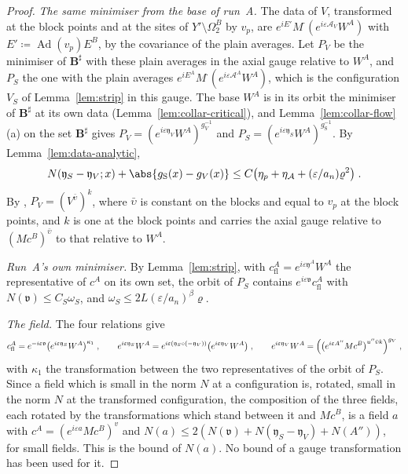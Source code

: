 \begin{proof}
\emph{The same minimiser from the base of run~A.} The data of $V$, transformed at the block points and at the sites of $Y' \setminus \Omega^B_2$ by $v_p$, are $e^{iE'}M^\cdot(e^{i\varepsilon\mathcal A_V}W^A)$ with $E' \coloneqq \operatorname{Ad}(v_p)E^B$, by the covariance of the plain averages. Let $P_V$ be the minimiser of $\mathbf B^\sharp$ with these plain averages in the axial gauge relative to $W^A$, and $P_S$ the one with the plain averages $e^{iE^A}M^\cdot(e^{i\varepsilon\mathcal A^A}W^A)$, which is the configuration $V_S$ of Lemma~\ref{lem:strip} in this gauge. The base $W^A$ is in its orbit the minimiser of $\mathbf B^\sharp$ at its own data (Lemma~\ref{lem:collar-critical}), and Lemma~\ref{lem:collar-flow}(a) on the set $\mathbf B^\sharp$ gives $P_V = (e^{i\varepsilon\mathfrak y_V}W^A)^{g_V^{-1}}$ and $P_S = (e^{i\varepsilon\mathfrak y_S}W^A)^{g_{\mathrm S}^{-1}}$. By Lemma~\ref{lem:data-analytic},
\[
    N(\mathfrak y_S - \mathfrak y_V; x) + \abs{g_{\mathrm S}(x) - g_V(x)} \leq C\bigl(\eta_p + \eta_{\mathcal A} + (\varepsilon/a_n)\varrho^2\bigr)\;.
\]
By \cite[(181)]{BalabanVAR}, $P_V = (V^{\bar\upsilon})^k$, where $\bar\upsilon$ is constant on the blocks and equal to $v_p$ at the block points, and $k$ is one at the block points and carries the axial gauge relative to $(Mc^B)^{\bar\upsilon}$ to that relative to $W^A$.

\emph{Run~A's own minimiser.} By Lemma~\ref{lem:strip}, with $c^A_{\mathrm{fl}} = e^{i\varepsilon\mathfrak y^A}W^A$ the representative of $c^A$ on its own set, the orbit of $P_S$ contains $e^{i\varepsilon\mathfrak v}c^A_{\mathrm{fl}}$ with $N(\mathfrak v) \leq C_S\omega_S$, and $\omega_S \leq 2L(\varepsilon/a_n)^\beta\varrho$.

\emph{The field.} The four relations give
\[
    c^A_{\mathrm{fl}} = e^{-i\varepsilon\mathfrak v}\bigl(e^{i\varepsilon\mathfrak y_S}W^A\bigr)^{\kappa_1}\;,
    \qquad
    e^{i\varepsilon\mathfrak y_S}W^A = e^{i\varepsilon(\mathfrak y_S \circ (-\mathfrak y_V))}\bigl(e^{i\varepsilon\mathfrak y_V}W^A\bigr)\;,
    \qquad
    e^{i\varepsilon\mathfrak y_V}W^A = \Bigl(\bigl(e^{i\varepsilon A''}Mc^B\bigr)^{u''\bar\upsilon k}\Bigr)^{g_V}\;,
\]
with $\kappa_1$ the transformation between the two representatives of the orbit of $P_S$. Since a field which is small in the norm $N$ at a configuration is, rotated, small in the norm $N$ at the transformed configuration, the composition of the three fields, each rotated by the transformations which stand between it and $Mc^B$, is a field $a$ with $c^A = (e^{i\varepsilon a}Mc^B)^v$ and $N(a) \leq 2(N(\mathfrak v) + N(\mathfrak y_S - \mathfrak y_V) + N(A''))$, for small fields. This is the bound of $N(a)$. No bound of a gauge transformation has been used for it.


\end{proof}
